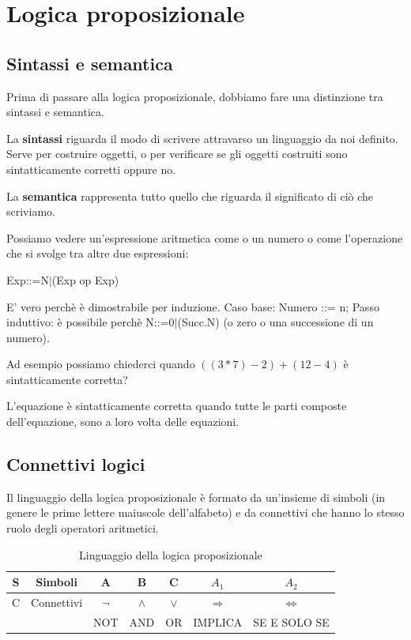 \chapter{Logica proposizionale}

\section*{Sintassi e semantica}
Prima di passare alla logica proposizionale, dobbiamo fare una distinzione tra sintassi e semantica.

La \textbf{sintassi} riguarda il modo di scrivere attravarso un linguaggio da noi definito. Serve per costruire oggetti, o per verificare se gli oggetti costruiti sono sintatticamente corretti oppure no.

La \textbf{semantica} rappresenta tutto quello che riguarda il significato di ciò che scriviamo.

Possiamo vedere un'espressione aritmetica come o un numero o come l'operazione che si svolge tra altre due espressioni:
\begin{center}
    Exp::=N$|$(Exp op Exp)
\end{center}
E' vero perchè è dimostrabile per induzione.
Caso base: Numero ::= n;
Passo induttivo: è possibile perchè N::=0$|$(Succ.N) (o zero o una successione di un numero).

Ad esempio possiamo chiederci quando $((3*7)-2)+(12-4)$ è sintatticamente corretta?

L'equazione è sintatticamente corretta quando tutte le parti composte dell'equazione, sono a loro volta delle equazioni.

\section{Connettivi logici}
Il linguaggio della logica proposizionale è formato da un'insieme di simboli (in genere le prime lettere maiuscole dell'alfabeto) e da connettivi che hanno lo stesso ruolo degli operatori aritmetici.

\begin{table}[ht]
    \centering
    \begin{tabular}{|cc|c|c|c|c|c|}
        \hline S & Simboli & A & B & C & $A_1$ & $A_2$\\\hline
        C & Connettivi & $\neg$ & $\land$ & $\lor$ & $\Longrightarrow$ & $\iff$\\
        && NOT & AND & OR & IMPLICA & SE E SOLO SE\\\hline
    \end{tabular}
    \caption{Linguaggio della logica proposizionale}
    \label{tab:lp_tab}
\end{table}

